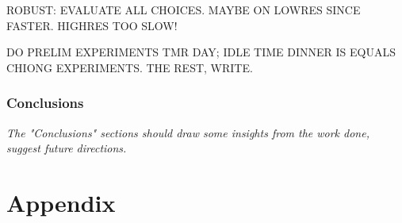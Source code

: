 \documentclass{article}
\theoremstyle{definition}
\begin{document}
\begin{multicols}{2}[]
ROBUST: EVALUATE ALL CHOICES. MAYBE ON LOWRES SINCE FASTER. HIGHRES TOO SLOW!

DO PRELIM EXPERIMENTS TMR DAY; IDLE TIME DINNER IS EQUALS CHIONG EXPERIMENTS. THE REST, WRITE.


\section{Conclusions}
\emph{The "Conclusions" sections should draw some insights from the work done, suggest future directions.}

\end{multicols}
\newpage



\vfill
\appendix
\part{Appendix}
\parttoc

\newpage
\end{document}
